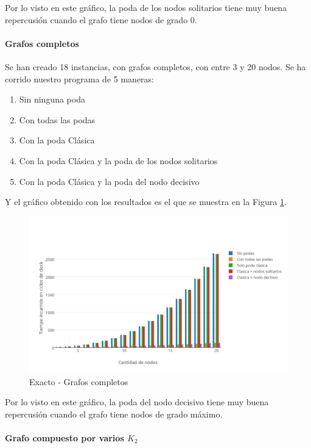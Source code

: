 Por lo visto en este gráfico, la poda de los nodos solitarios tiene muy buena repercusión cuando el grafo tiene nodos de grado 0.

\paragraph{Grafos completos} 

Se han creado 18 instancias, con grafos completos, con entre 3 y 20 nodos. Se ha corrido nuestro programa de 5 maneras:

\begin{enumerate}
	\item Sin ninguna poda
	\item Con todas las podas 
	\item Con la poda Clásica
	\item Con la poda Clásica y la poda de los nodos solitarios
	\item Con la poda Clásica y la poda del nodo decisivo
\end{enumerate}

Y el gráfico obtenido con los resultados es el que se muestra en la Figura \ref{fig:1D}.

\begin{figure}[htb]
	\begin{center}
    		\includegraphics[scale=0.8]{imagenes/exacto-completos.png}
	\end{center}
	\caption{Exacto - Grafos completos}\label{fig:1D}
\end{figure}

Por lo visto en este gráfico, la poda del nodo decisivo tiene muy buena repercusión cuando el grafo tiene nodos de grado máximo.

\paragraph{Grafo compuesto por varios $K_2$}

